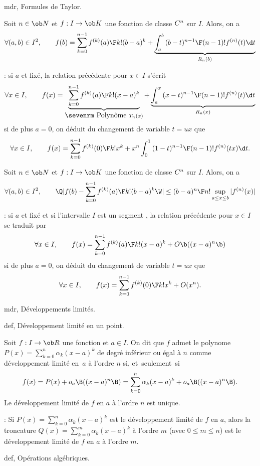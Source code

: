 \Section mdr, Formules de Taylor. 


\Theoreme [Title=Formule de Taylor]
Soit $n\in\ob N$ et $f:I\to\ob K$ une fonction de classe $\sc C^n$ sur $I$. Alors, on a 
$$
\forall(a,b)\in I^2, \qquad f(b)=\sum_{k=0}^{n-1}{f^{(k)}(a)\F k!}(b-a)^k+\underbrace{\int_a^b{(b-t)^{n-1}\F(n-1)!}f^{(n)}(t)\d t}_{R_n(b)}
$$

\Remarque : si $a$ et fix\'e, la relation pr\'ec\'edente pour $x\in I$ s'\'ecrit 
$$
\forall x\in I, \qquad f(x)=\underbrace{\sum_{k=0}^{n-1}{f^{(k)}(a)\F k!}(x-a)^k}_{\mbox{\sevenrm Polyn\^ome }T_n(x)}+\underbrace{\int_a^x{(x-t)^{n-1}\F(n-1)!}f^{(n)}(t)\d t}_{R_n(x)}
$$
si de plus $a=0$, on d\'eduit du changement de variable $t=ux$ que 
$$
\forall x\in I, \qquad f(x)=\sum_{k=0}^{n-1}{f^{(k)}(0)\F k!}x^k+x^n\int_0^1{(1-t)^{n-1}\F(n-1)!}f^{(n)}(tx)\d t.
$$
\bigskip


\Theoreme [Title=In\'egalit\'e de Taylor-Lagrange] 
Soit $n\in\ob N$ et $f:I\to\ob K$ une fonction de classe $\sc C^n$ sur $I$. Alors, on a 
$$
\forall(a,b)\in I^2, \qquad\Q|f(b)-\sum_{k=0}^{n-1}{f^{(k)}(a)\F k!}(b-a)^k\W|\le{(b-a)^n\F n!}\sup_{a\le x\le b}|f^{(n)}(x)|
$$

\Remarque : si $a$ et fix\'e et si l'intervalle $I$ est un segment , la relation pr\'ec\'edente pour $x\in I$ se traduit par 
$$
\forall x\in I, \qquad f(x)=\sum_{k=0}^{n-1}{f^{(k)}(a)\F k!}(x-a)^k+O\b((x-a)^n\b)
$$
si de plus $a=0$, on d\'eduit du changement de variable $t=ux$ que 
$$
\forall x\in I, \qquad f(x)=\sum_{k=0}^{n-1}{f^{(k)}(0)\F k!}x^k+O(x^n).
$$

\Section mdr, D\'eveloppements limit\'es. 

\Subsection def, D\'eveloppement limit\'e en un point. 
\bigskip

\Definition []  Soit $f:I\to\ob R$ une fonction et $a\in I$. On dit que $f$ admet le polynome $P(x)=\sum_{k=0}^n\alpha_k(x-a)^k$
 de degr\'e inf\'erieur ou \'egal \`a $n$ comme d\'eveloppement limit\'e en~$a$ \`a l'ordre $n$ si, et~seulement~si 
$$
f(x)=P(x)+o_a\B((x-a)^n\B)=\sum_{k=0}^n\alpha_k(x-a)^k+o_a\B((x-a)^n\B).
$$
Le d\'eveloppement limit\'e de $f$ en $a$ \`a l'ordre $n$ est unique. 
\bigskip

\Remarque : Si $P(x)=\sum_{k=0}^n\alpha_k(x-a)^k$ est le d\'eveloppement limit\'e de $f$ en $a$, alors 
la troncature $Q(x)=\sum_{k=0}^m\alpha_k(x-a)^k$ \`a l'ordre $m$ (avec $0\le m\le n$) est le d\'eveloppement limit\'e 
de $f$ en $a$ \`a l'ordre $m$. 
\bigskip

\Subsection def, Op\'erations alg\'ebriques. 

